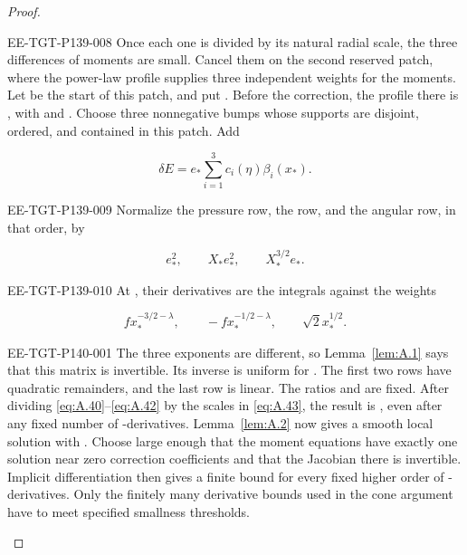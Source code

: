 \begin{proof}
\begin{EESegment}{EE-TGT-P139-008}
Once each one is divided by its natural radial scale, the three differences of moments are small. Cancel them on the
second reserved patch, where the power-law profile supplies three independent weights for the moments. Let
 be the start of this patch, and put . Before the correction,
the profile there is , with
 and . Choose three nonnegative bumps
 whose supports are disjoint, ordered, and contained in this patch. Add
\end{EESegment}
\[
  \delta E=e_*\sum_{i=1}^3c_i(\eta)\beta_i(x_*).
\]
\begin{EESegment}{EE-TGT-P139-009}
Normalize the pressure row, the  row, and the angular row, in that order, by
\end{EESegment}
\begin{equation}
  e_*^2,\qquad X_*e_*^2,\qquad X_*^{3/2}e_*.
  \tag{A.43}\label{eq:A.43}
\end{equation}
\begin{EESegment}{EE-TGT-P139-010}
At , their derivatives are the integrals against the weights
\end{EESegment}
\[
  fx_*^{-3/2-\lambda},\qquad -fx_*^{-1/2-\lambda},\qquad \sqrt{2}x_*^{1/2}.
\]

%
\begin{EESegment}{EE-TGT-P140-001}
The three exponents are different, so Lemma~\ref{lem:A.1} says that this matrix is invertible. Its inverse is uniform
for . The first two rows have quadratic remainders, and the last row is linear.
The ratios  and  are fixed. After dividing
\eqref{eq:A.40}--\eqref{eq:A.42} by the scales in \eqref{eq:A.43}, the result is
, even after any fixed number of
-derivatives. Lemma~\ref{lem:A.2} now gives a smooth local solution with
. Choose
 large enough that the moment equations have exactly one solution near zero correction
coefficients and that the Jacobian there is invertible. Implicit differentiation then gives a finite bound for every
fixed higher order of -derivatives. Only the finitely many derivative bounds used in the cone
argument have to meet specified smallness thresholds.
\end{EESegment}


\end{proof}
